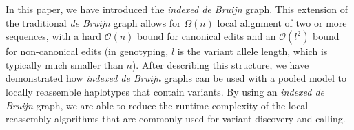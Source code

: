 \documentclass[11pt]{article}
\begin{document}
In this paper, we have introduced the \emph{indexed de Bruijn} graph. This extension of the traditional
\emph{de Bruijn} graph allows for $\Omega(n)$ local alignment of two or more sequences, with a hard
$\mathcal{O}(n)$ bound for canonical edits and an $\mathcal{O}(l^2)$ bound for non-canonical edits
(in genotyping, $l$ is the variant allele length, which is typically much smaller than $n$). After describing this structure, we have demonstrated how
\emph{indexed de Bruijn} graphs can be used with a pooled model to locally reassemble haplotypes that contain
variants. By using an \emph{indexed de Bruijn} graph, we are able to reduce the runtime complexity of the local
reassembly algorithms that are commonly used for variant discovery and calling.



\end{document}

